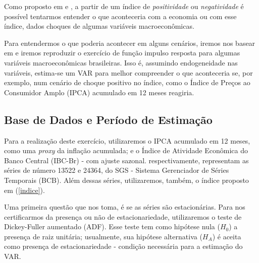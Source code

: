 Como proposto em  e , a partir de um índice de \textit{positividade} ou \textit{negatividade} é possível tentarmos entender o que aconteceria com a economia ou com esse índice, dados choques de algumas variáveis macroeconômicas.

Para entendermos o que poderia acontecer em alguns cenários, iremos nos basear em  e iremos reproduzir o exercício de função impulso resposta para algumas variáveis macroeconômicas brasileiras. Isso é, assumindo endogeneidade nas variáveis, estima-se um VAR para melhor compreender o que aconteceria se, por exemplo, num cenário de choque positivo no índice, como o Índice de Preços ao Consumidor Amplo (IPCA) acumulado em 12 meses reagiria. 

\subsection{Base de Dados e Período de Estimação}

Para a realização deste exercício, utilizaremos o IPCA acumulado em 12 meses, como uma \textit{proxy} da inflação acumulada; e o Índice de Atividade Econômica do Banco Central (IBC-Br) - com ajuste sazonal. respectivamente, representam as séries de número 13522 e 24364, do SGS - Sistema Gerenciador de Séries Temporais (BCB). Além dessas séries, utilizaremos, também, o índice proposto em (\ref{indice}). 

Uma primeira questão que nos toma, é se as séries são estacionárias. Para nos certificarmos da presença ou não de estacionariedade, utilizaremos o teste de Dickey-Fuller aumentado (ADF). Esse teste tem como hipótese nula ($H_0$) a presença de raiz unitária; usualmente, sua hipótese alternativa ($H_A$) é aceita como presença de estacionariedade - condição necessária para a estimação do VAR.  

